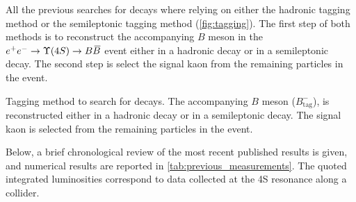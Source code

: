 All the previous searches for \BKnn decays where relying on either the hadronic tagging method or the semileptonic tagging method (\cref{fig:tagging}).
The first step of both methods is to reconstruct the accompanying $B$ meson in the $\epem\to\Y4S\to\BB$ event either in a hadronic decay or in a semileptonic decay.
The second step is select the signal kaon from the remaining particles in the event.

{Tagging method to search for \BKpnn decays.
The accompanying $B$ meson ($B^-_{\mathrm{tag}}$), is reconstructed either in a hadronic decay or in a semileptonic decay.
The signal kaon is selected from the remaining particles in the event.}

Below, a brief chronological review of the most recent published results is given, and numerical results are reported in \cref{tab:previous_measurements}.
The quoted integrated luminosities correspond to data collected at the \Y4S resonance along a \epem collider.
